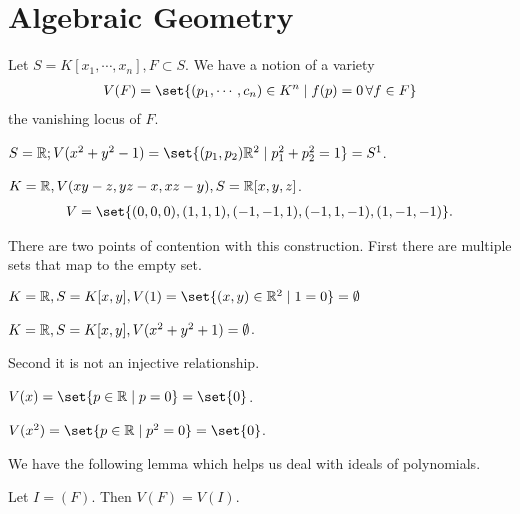 \newpage
\section{Algebraic Geometry}

Let $S = K [ x_1, \cdots , x_n], F \subset S$. We have a notion of a variety
\begin{align*}
    V(F) = \set{ (p_1, \cdots , c_n ) \in K^n  \mid f(p) = 0 \, \forall f \in F }
\end{align*}
the vanishing locus of $F$.

\begin{example}
$S = \R; V ( x^2 + y^2 -1) = \set{(p_1, p_2 ) \R^2 \mid p_1^2 + p_2^2 = 1 } = S^1$.
\end{example}

\begin{example}
$K = \mathbb{R} , V( xy-z, yz -x , xz - y) , S = \mathbb{R} [ x,y,z]$.
\begin{align*}
    V = \set{ ( 0,0,0) , (1,1,1) , (-1, -1, 1) , (-1, 1 ,-1) , (1 , -1 , -1) }.
\end{align*}
\end{example}

There are two points of contention with this construction. First there are multiple sets that map to the empty set.

\begin{example}
    $K = \R, S = K[x,y] , V (1) = \set{( x,y) \in \R^2 \mid 1 = 0} = \emptyset$
\end{example}

\begin{example}
    $K = \mathbb{R} , S = K [ x,y], V( x^2 + y^2 +1 ) = \emptyset$.
\end{example}

Second it is not an injective relationship.

\begin{example}
    $V(x) = \set{p \in \R \mid p = 0} = \set{ 0}$.
\end{example}

\begin{example}
    $V(x^2) = \set{p \in \R \mid p^2 = 0} = \set{ 0}$.
\end{example}

We have the following lemma which helps us deal with ideals of polynomials.

\begin{lemma}\label{happyLemma}
Let $I = (F) $. Then $V(F) = V(I)$.
\end{lemma}

